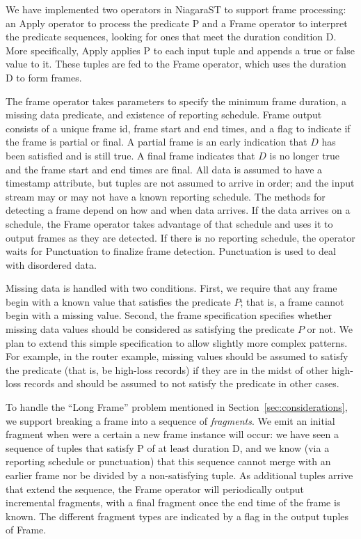 \documentclass{vldb}
\newcommand{\dquote}[1]{``#1''}
\begin{document}
\begin{appendix}
We have implemented two operators in NiagaraST to support frame processing: an Apply operator to process the predicate P and a Frame operator to interpret the predicate sequences, looking for ones that meet the duration condition D. More specifically, Apply applies P to each input tuple and appends a true or false value to it. These tuples are fed to the Frame operator, which uses the duration D to form frames.

The frame operator takes parameters to specify the minimum frame duration, a missing data predicate, and existence of reporting schedule. Frame output consists of a unique frame id, frame start and end times, and a flag to indicate if the frame is partial or final. A partial frame is an early indication that $D$ has been satisfied and is still true. A final frame indicates that $D$ is no longer true and the frame start and end times are final. All data is assumed to have a timestamp attribute, but tuples are not assumed to arrive in order; and the input stream may or may not have a known reporting schedule. The methods for detecting a frame depend on how and when data arrives. If the data arrives on a schedule, the Frame operator takes advantage of that schedule and uses it to output frames as they are detected. If there is no reporting schedule, the operator waits for Punctuation to finalize frame detection. Punctuation is used to deal with disordered data.

Missing data is handled with two conditions. First, we require that any frame begin with a known value that satisfies the predicate $P$; that is, a frame cannot begin with a missing value. Second, the frame specification specifies whether missing data values should be considered as satisfying the predicate $P$ or not. We plan to extend this simple specification to allow slightly more complex patterns. For example, in the router example, missing values should be assumed to satisfy the predicate (that is, be high-loss records) if they are in the midst of other high-loss records and should be assumed to not satisfy the predicate in other cases.
 
To handle the \dquote{Long Frame} problem mentioned in Section~\ref{sec:considerations}, we support breaking a frame into a sequence of \emph{fragments}. We emit an initial fragment when were a certain a new frame instance will occur: we have seen a sequence of tuples that satisfy P of at least duration D, and we know (via a reporting schedule or punctuation) that this sequence cannot merge with an earlier frame nor be divided by a non-satisfying tuple. As additional tuples arrive that extend the sequence, the Frame operator will periodically output incremental fragments, with a final fragment once the end time of the frame is known. The different fragment types are indicated by a flag in the output tuples of Frame.


\end{appendix}
\end{document}
